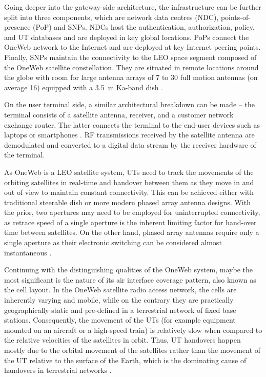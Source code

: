 \documentclass[english, 12pt, a4paper, elec, utf8, a-1b, online]{aaltothesis}
\begin{document}
Going deeper into the gateway-side architecture, the infrastructure can be further split into three components, which are network data centres (NDC), points-of-presence (PoP) and SNPs.
NDCs host the authentication, authorization, policy, and UT databases and are deployed in key global locations.
PoPs connect the OneWeb network to the Internet and are deployed at key Internet peering points.
Finally, SNPs maintain the connectivity to the LEO space segment composed of the OneWeb satellite constellation.
They are situated in remote locations around the globe with room for large antenna arrays of 7 to 30 full motion antennas (on average 16) equipped with a \SI{3.5}{\meter} Ka-band dish \cite{henri2020oneweb}.

On the user terminal side, a similar architectural breakdown can be made -- the terminal consists of a satellite antenna, receiver, and a customer network exchange router.
The latter connects the terminal to the end-user devices such as laptops or smartphones \cite{henri2020oneweb}. RF transmissions received by the satellite antenna are demodulated and converted to a digital data stream by the receiver hardware of the terminal.

As OneWeb is a LEO satellite system, UTs need to track the movements of the orbiting satellites in real-time and handover between them as they move in and out of view to maintain constant connectivity.
This can be achieved either with traditional steerable dish or more modern phased array antenna designs.
With the prior, two apertures may need to be employed for uninterrupted connectivity, as retrace speed of a single aperture is the inherent limiting factor for hand-over time between satellites.
On the other hand, phased array antennas require only a single aperture as their electronic switching can be considered almost instantaneous \cite{worldvu2016loi}.

Continuing with the distinguishing qualities of the OneWeb system, maybe the most significant is the nature of its air interface coverage pattern, also known as the cell layout.
In the OneWeb satellite radio access network, the cells are inherently varying and mobile, while on the contrary they are practically geographically static and pre-defined in a terrestrial network of fixed base stations.
Consequently, the movement of the UTs (for example equipment mounted on an aircraft or a high-speed train) is relatively slow when compared to the relative velocities of the satellites in orbit.
Thus, UT handovers happen mostly due to the orbital movement of the satellites rather than the movement of the UT relative to the surface of the Earth, which is the dominating cause of handovers in terrestrial networks \cite{corson2019admission}.
\end{document}
